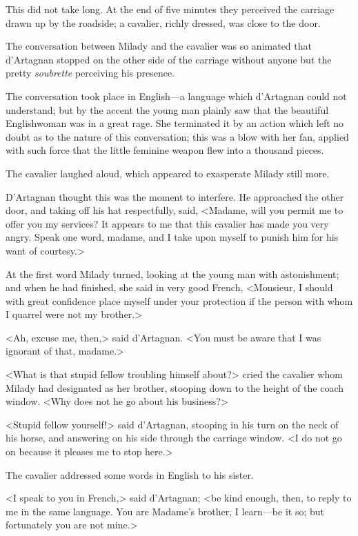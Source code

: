 This did not take long. At the end of five minutes they perceived the carriage drawn up by the roadside; a cavalier, richly dressed, was close to the door. 

The conversation between Milady and the cavalier was so animated that d'Artagnan stopped on the other side of the carriage without anyone but the pretty \textit{soubrette} perceiving his presence. 

The conversation took place in English---a language which d'Artagnan could not understand; but by the accent the young man plainly saw that the beautiful Englishwoman was in a great rage. She terminated it by an action which left no doubt as to the nature of this conversation; this was a blow with her fan, applied with such force that the little feminine weapon flew into a thousand pieces. 

The cavalier laughed aloud, which appeared to exasperate Milady still more. 

D'Artagnan thought this was the moment to interfere. He approached the other door, and taking off his hat respectfully, said, <Madame, will you permit me to offer you my services? It appears to me that this cavalier has made you very angry. Speak one word, madame, and I take upon myself to punish him for his want of courtesy.> 

At the first word Milady turned, looking at the young man with astonishment; and when he had finished, she said in very good French, <Monsieur, I should with great confidence place myself under your protection if the person with whom I quarrel were not my brother.> 

<Ah, excuse me, then,> said d'Artagnan. <You must be aware that I was ignorant of that, madame.> 

<What is that stupid fellow troubling himself about?> cried the cavalier whom Milady had designated as her brother, stooping down to the height of the coach window. <Why does not he go about his business?> 

<Stupid fellow yourself!> said d'Artagnan, stooping in his turn on the neck of his horse, and answering on his side through the carriage window. <I do not go on because it pleases me to stop here.> 

The cavalier addressed some words in English to his sister. 

<I speak to you in French,> said d'Artagnan; <be kind enough, then, to reply to me in the same language. You are Madame's brother, I learn---be it so; but fortunately you are not mine.> 

